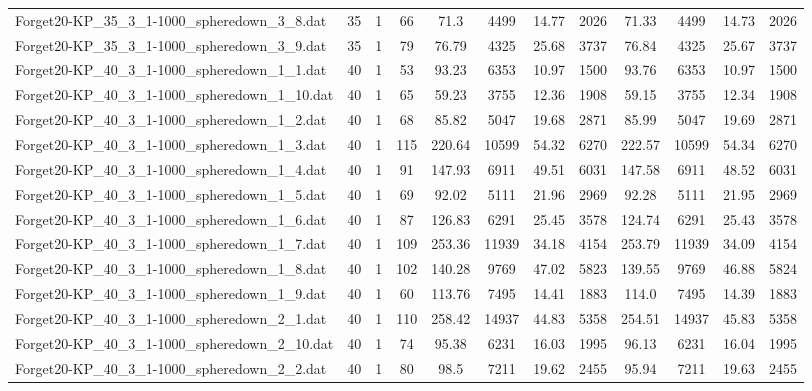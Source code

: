 \begin{sidewaystable}[!ht]
{\begin{tabular}{lccccccccccc}
Forget20-KP\_35\_3\_1-1000\_spheredown\_3\_8.dat & 35 & 1 & 66 & 71.3 & 4499 & 14.77 & 2026 & 71.33 & 4499 &  \textcolor{blue2}{14.73} & 2026 \\
Forget20-KP\_35\_3\_1-1000\_spheredown\_3\_9.dat & 35 & 1 & 79 & 76.79 & 4325 & 25.68 & 3737 & 76.84 & 4325 & 25.67 & 3737 \\
Forget20-KP\_40\_3\_1-1000\_spheredown\_1\_1.dat & 40 & 1 & 53 & 93.23 & 6353 &  \textcolor{blue2}{10.97} & 1500 & 93.76 & 6353 &  \textcolor{blue2}{10.97} & 1500 \\
Forget20-KP\_40\_3\_1-1000\_spheredown\_1\_10.dat & 40 & 1 & 65 & 59.23 & 3755 & 12.36 & 1908 & 59.15 & 3755 &  \textcolor{blue2}{12.34} & 1908 \\
Forget20-KP\_40\_3\_1-1000\_spheredown\_1\_2.dat & 40 & 1 & 68 & 85.82 & 5047 &  \textcolor{blue2}{19.68} & 2871 & 85.99 & 5047 & 19.69 & 2871 \\
Forget20-KP\_40\_3\_1-1000\_spheredown\_1\_3.dat & 40 & 1 & 115 & 220.64 & 10599 & 54.32 & 6270 & 222.57 & 10599 & 54.34 & 6270 \\
Forget20-KP\_40\_3\_1-1000\_spheredown\_1\_4.dat & 40 & 1 & 91 & 147.93 & 6911 & 49.51 & 6031 & 147.58 & 6911 &  \textcolor{blue2}{48.52} & 6031 \\
Forget20-KP\_40\_3\_1-1000\_spheredown\_1\_5.dat & 40 & 1 & 69 & 92.02 & 5111 & 21.96 & 2969 & 92.28 & 5111 &  \textcolor{blue2}{21.95} & 2969 \\
Forget20-KP\_40\_3\_1-1000\_spheredown\_1\_6.dat & 40 & 1 & 87 & 126.83 & 6291 & 25.45 & 3578 & 124.74 & 6291 & 25.43 & 3578 \\
Forget20-KP\_40\_3\_1-1000\_spheredown\_1\_7.dat & 40 & 1 & 109 & 253.36 & 11939 & 34.18 & 4154 & 253.79 & 11939 &  \textcolor{blue2}{34.09} & 4154 \\
Forget20-KP\_40\_3\_1-1000\_spheredown\_1\_8.dat & 40 & 1 & 102 & 140.28 & 9769 & 47.02 & 5823 & 139.55 & 9769 & 46.88 & 5824 \\
Forget20-KP\_40\_3\_1-1000\_spheredown\_1\_9.dat & 40 & 1 & 60 & 113.76 & 7495 & 14.41 & 1883 & 114.0 & 7495 &  \textcolor{blue2}{14.39} & 1883 \\
Forget20-KP\_40\_3\_1-1000\_spheredown\_2\_1.dat & 40 & 1 & 110 & 258.42 & 14937 & 44.83 & 5358 & 254.51 & 14937 & 45.83 & 5358 \\
Forget20-KP\_40\_3\_1-1000\_spheredown\_2\_10.dat & 40 & 1 & 74 & 95.38 & 6231 &  \textcolor{blue2}{16.03} & 1995 & 96.13 & 6231 & 16.04 & 1995 \\
Forget20-KP\_40\_3\_1-1000\_spheredown\_2\_2.dat & 40 & 1 & 80 & 98.5 & 7211 &  \textcolor{blue2}{19.62} & 2455 & 95.94 & 7211 & 19.63 & 2455 \\

\end{tabular}}
\end{sidewaystable}
